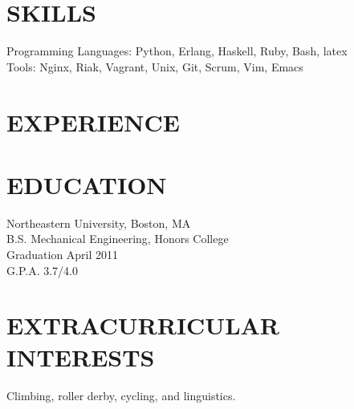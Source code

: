 \documentclass{res}
\begin{document}

\address{\bf  Högbergsgatan 66C \\ Stockholm, 11854, Sweden \\ +46 700012715}

\begin{resume}

\section{SKILLS}
    Programming Languages: Python, Erlang, Haskell, Ruby, Bash, latex \\
    Tools: Nginx, Riak, Vagrant, Unix, Git, Scrum, Vim, Emacs \\

\section{EXPERIENCE}

\section{EDUCATION}
    Northeastern University, Boston, MA \\
    B.S. Mechanical Engineering, Honors College \\
    Graduation April 2011 \\
    G.P.A. 3.7/4.0

\section{EXTRACURRICULAR INTERESTS}
    Climbing, roller derby, cycling, and linguistics.

\end{resume}
\end{document}
